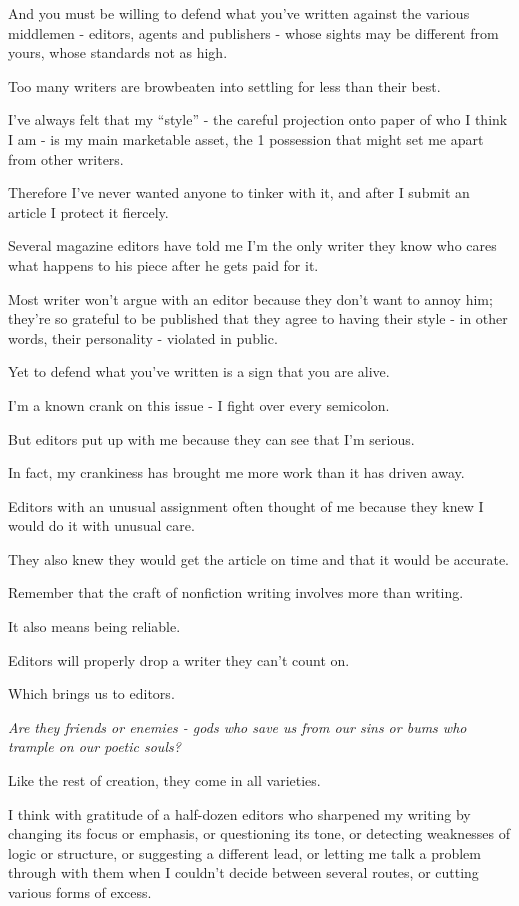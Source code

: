 \documentclass{book}
\numberwithin{equation}{section}
\begin{document}
And you must be willing to defend what you've written against the various middlemen - editors, agents and publishers - whose sights may be different from yours, whose standards not as high.

Too many writers are browbeaten into settling for less than their best.

I've always felt that my ``style'' - the careful projection onto paper of who I think I am - is my main marketable asset, the 1 possession that might set me apart from other writers.

Therefore I've never wanted anyone to tinker with it, and after I submit an article I protect it fiercely.

Several magazine editors have told me I'm the only writer they know who cares what happens to his piece after he gets paid for it.

Most writer won't argue with an editor because they don't want to annoy him; they're so grateful to be published that they agree to having their style - in other words, their personality - violated in public.

%
Yet to defend what you've written is a sign that you are alive.

I'm a known crank on this issue - I fight over every semicolon.

But editors put up with me because they can see that I'm serious.

In fact, my crankiness has brought me more work than it has driven away.

Editors with an unusual assignment often thought of me because they knew I would do it with unusual care.

They also knew they would get the article on time and that it would be accurate.

Remember that the craft of nonfiction writing involves more than writing.

It also means being reliable.

Editors will properly drop a writer they can't count on.

%
Which brings us to editors.

\textit{Are they friends or enemies - gods who save us from our sins or bums who trample on our poetic souls?}

Like the rest of creation, they come in all varieties.

I think with gratitude of a half-dozen editors who sharpened my writing by changing its focus or emphasis, or questioning its tone, or detecting weaknesses of logic or structure, or suggesting a different lead, or letting me talk a problem through with them when I couldn't decide between several routes, or cutting various forms of excess.
\end{document}

